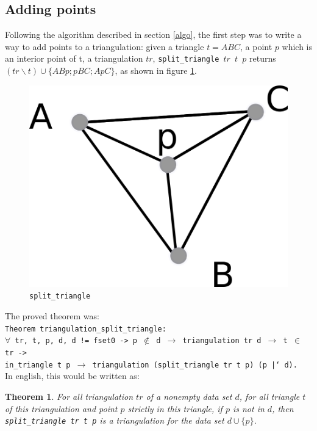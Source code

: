 \documentclass[a4paper,10pt]{article}
\newtheorem{theorem}{Theorem}
\begin{document}
\subsection{Adding points}
\label{theorem1}
Following the algorithm described in section \ref{algo}, the first step was to write a way to add points to a triangulation: given a triangle $t = ABC$, a point $p$ which is an interior point of t, a triangulation $tr$, {\tt split\_triangle $tr$ $t$ $p$} returns $(tr \smallsetminus t) \cup \{ABp;pBC;ApC\}$, as shown in figure \ref{split_triangle}.
\begin{figure}
  \centering
  \includegraphics[scale=2]{split_triangle}
    \caption{\label{split_triangle} {\tt split\_triangle}}
\end{figure}

 The proved theorem was:\\
{\tt Theorem triangulation\_split\_triangle:\\
  $\forall$ tr, t, p, d, d != fset0 -> p $\notin$ d $\rightarrow$
                        triangulation tr d $\rightarrow$ t $\in$ tr ->\\
                        in\_triangle t p $\rightarrow$
                        triangulation (split\_triangle tr t p) (p |` d).\\
                       }
In english, this would be written as:
\begin{theorem}
  For all triangulation $tr$ of a nonempty data set $d$,
  for all triangle $t$ of this triangulation and point $p$ strictly in this triangle,
  if $p$ is not in $d$, then
  {\tt split\_triangle tr t p} is a triangulation for the data set $d \cup \{p\}$.
\end{theorem}
\end{document}
